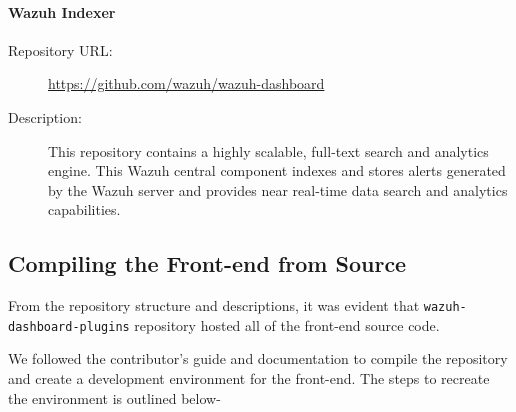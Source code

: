 \paragraph{Wazuh Indexer}
\begin{description}
    \item[Repository URL:] \url{https://github.com/wazuh/wazuh-dashboard}
    \item[Description:] This repository contains a highly scalable, full-text search and analytics engine. This Wazuh central component indexes and stores alerts generated by the Wazuh server and provides near real-time data search and analytics capabilities.
\end{description}

\subsection{Compiling the Front-end from Source}
From the repository structure and descriptions, it was evident that \texttt{wazuh-dashboard-plugins} repository hosted all of the front-end source code.

We followed the contributor's guide and documentation to compile the repository and create a development environment for the front-end. The steps to recreate the environment is outlined below-


